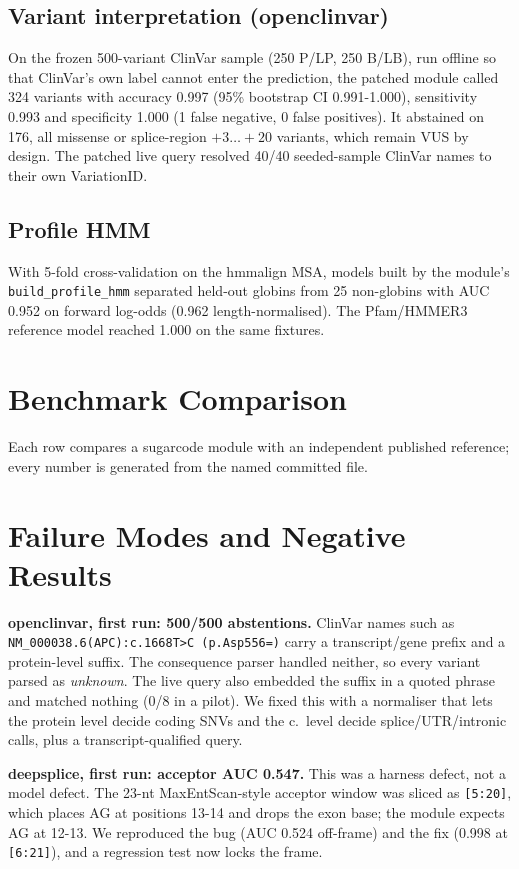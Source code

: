 \documentclass[11pt]{article}
\begin{document}
\subsection{Variant interpretation (openclinvar)}
On the frozen 500-variant ClinVar sample (250 P/LP, 250 B/LB), run offline so
that ClinVar's own label cannot enter the prediction, the patched module called
324 variants with accuracy 0.997 (95\% bootstrap CI 0.991-1.000), sensitivity
0.993 and specificity 1.000 (1 false negative, 0 false positives). It
abstained on 176, all missense or splice-region $+3\ldots+20$ variants, which
remain VUS by design. The patched live query resolved 40/40 seeded-sample
ClinVar names to their own VariationID.

\subsection{Profile HMM}
With 5-fold cross-validation on the hmmalign MSA, models built by the module's
\texttt{build\_profile\_hmm} separated held-out globins from 25 non-globins with
AUC 0.952 on forward log-odds (0.962 length-normalised). The Pfam/HMMER3
reference model reached 1.000 on the same fixtures.

\section{Benchmark Comparison}
Each row compares a sugarcode module with an independent published reference; every number is generated from the named committed file.

\section{Failure Modes and Negative Results}
\textbf{openclinvar, first run: 500/500 abstentions.} ClinVar names such as
\texttt{NM\_000038.6(APC):c.1668T>C (p.Asp556=)} carry a transcript/gene prefix
and a protein-level suffix. The consequence parser handled neither, so every
variant parsed as \emph{unknown}. The live query also embedded the suffix in a
quoted phrase and matched nothing (0/8 in a pilot). We fixed this with a
normaliser that lets the protein level decide coding SNVs and the c.\ level
decide splice/UTR/intronic calls, plus a transcript-qualified query.

\textbf{deepsplice, first run: acceptor AUC 0.547.} This was a harness defect,
not a model defect. The 23-nt MaxEntScan-style acceptor window was sliced as
\texttt{[5:20]}, which places AG at positions 13-14 and drops the exon base;
the module expects AG at 12-13. We reproduced the bug (AUC 0.524 off-frame) and
the fix (0.998 at \texttt{[6:21]}), and a regression test now locks the frame.
\end{document}
